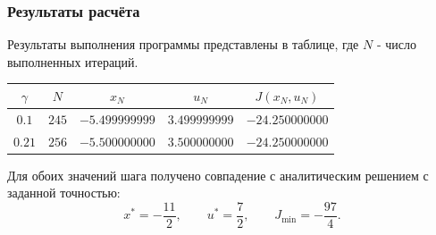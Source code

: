 \subsubsection*{Результаты расчёта}

Результаты выполнения программы представлены в таблице,
где \(N\) - число выполненных итераций.

\begin{center}
\begin{tabular}{c|c|c|c|c}
\(\gamma\) & \(N\) & \(x_N\) & \(u_N\) & \(J(x_N,u_N)\)\\
\hline
\(0.1\) & \(245\) &
\(-5.499999999\) & \(3.499999999\) & \(-24.250000000\)\\
\(0.21\) & \(256\) &
\(-5.500000000\) & \(3.500000000\) & \(-24.250000000\)
\end{tabular}
\end{center}

Для обоих значений шага получено совпадение
с аналитическим решением с заданной точностью:
\[
x^*=-\frac{11}{2},\qquad
u^*=\frac72,\qquad
J_{\min}=-\frac{97}{4}.
\]